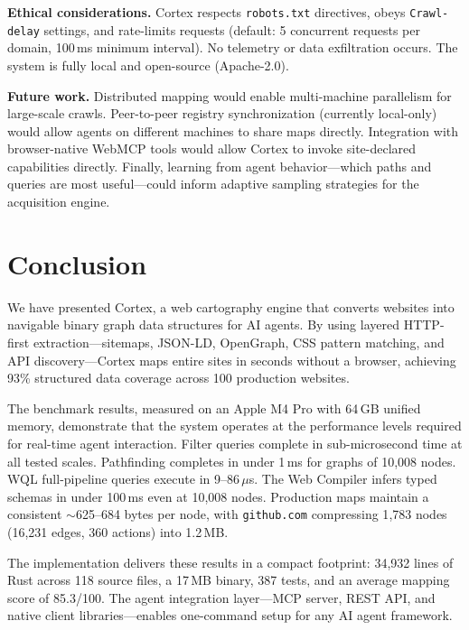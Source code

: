 \documentclass[10pt, twocolumn]{article}
\begin{document}
\textbf{Ethical considerations.} Cortex respects \texttt{robots.txt} directives, obeys \texttt{Crawl-delay} settings, and rate-limits requests (default: 5 concurrent requests per domain, 100\,ms minimum interval). No telemetry or data exfiltration occurs. The system is fully local and open-source (Apache-2.0).

\textbf{Future work.} Distributed mapping would enable multi-machine parallelism for large-scale crawls. Peer-to-peer registry synchronization (currently local-only) would allow agents on different machines to share maps directly. Integration with browser-native WebMCP tools would allow Cortex to invoke site-declared capabilities directly. Finally, learning from agent behavior---which paths and queries are most useful---could inform adaptive sampling strategies for the acquisition engine.


\section{Conclusion}
\label{sec:conclusion}

We have presented Cortex, a web cartography engine that converts websites into navigable binary graph data structures for AI agents. By using layered HTTP-first extraction---sitemaps, JSON-LD, OpenGraph, CSS pattern matching, and API discovery---Cortex maps entire sites in seconds without a browser, achieving 93\% structured data coverage across 100 production websites.

The benchmark results, measured on an Apple M4 Pro with 64\,GB unified memory, demonstrate that the system operates at the performance levels required for real-time agent interaction. Filter queries complete in sub-microsecond time at all tested scales. Pathfinding completes in under 1\,ms for graphs of 10{,}008 nodes. WQL full-pipeline queries execute in 9--86\,$\mu$s. The Web Compiler infers typed schemas in under 100\,ms even at 10{,}008 nodes. Production maps maintain a consistent $\sim$625--684 bytes per node, with \texttt{github.com} compressing 1{,}783 nodes (16{,}231 edges, 360 actions) into 1.2\,MB.

The implementation delivers these results in a compact footprint: 34{,}932 lines of Rust across 118 source files, a 17\,MB binary, 387 tests, and an average mapping score of 85.3/100. The agent integration layer---MCP server, REST API, and native client libraries---enables one-command setup for any AI agent framework.
\end{document}

